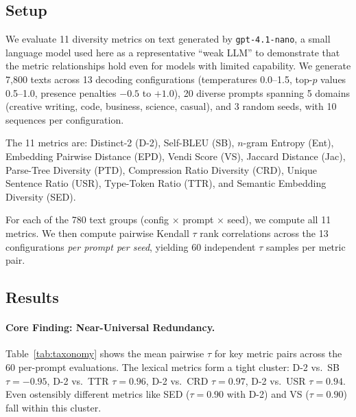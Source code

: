 \documentclass[11pt]{article}
\begin{document}
\subsection{Setup}

We evaluate 11 diversity metrics on text generated by
\texttt{gpt-4.1-nano}, a small language model used here as a
representative ``weak LLM'' to demonstrate that the metric
relationships hold even for models with limited capability.
We generate 7{,}800 texts across 13 decoding configurations
(temperatures 0.0--1.5, top-$p$ values 0.5--1.0, presence
penalties $-0.5$ to $+1.0$), 20 diverse prompts spanning
5 domains (creative writing, code, business, science, casual),
and 3 random seeds, with 10 sequences per configuration.

The 11 metrics are: Distinct-2 (D-2), Self-BLEU (SB), $n$-gram
Entropy (Ent), Embedding Pairwise Distance (EPD), Vendi Score (VS),
Jaccard Distance (Jac), Parse-Tree Diversity (PTD), Compression
Ratio Diversity (CRD), Unique Sentence Ratio (USR), Type-Token
Ratio (TTR), and Semantic Embedding Diversity (SED).

For each of the 780 text groups (config $\times$ prompt $\times$ seed),
we compute all 11 metrics. We then compute pairwise Kendall $\tau$
rank correlations across the 13 configurations \emph{per prompt per seed},
yielding 60 independent $\tau$ samples per metric pair.

\subsection{Results}

\paragraph{Core Finding: Near-Universal Redundancy.}
Table~\ref{tab:taxonomy} shows the mean pairwise $\tau$ for key
metric pairs across the 60 per-prompt evaluations. The lexical
metrics form a tight cluster: D-2 vs.\ SB $\tau = -0.95$,
D-2 vs.\ TTR $\tau = 0.96$, D-2 vs.\ CRD $\tau = 0.97$,
D-2 vs.\ USR $\tau = 0.94$. Even ostensibly different metrics
like SED ($\tau = 0.90$ with D-2) and VS ($\tau = 0.90$)
fall within this cluster.
\end{document}
